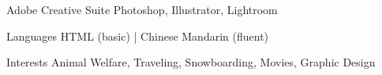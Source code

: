 

\begin{cvskills}
  \cvskill
    {Adobe Creative Suite} %
    {Photoshop, Illustrator, Lightroom} %
\end{cvskills}

\begin{cvskills}
  \cvskill
    {Languages} %
    {HTML (basic) | Chinese Mandarin (fluent)} %
\end{cvskills}

\begin{cvskills}
  \cvskill
    {Interests} %
    {Animal Welfare, Traveling, Snowboarding, Movies, Graphic Design} %
\end{cvskills}


